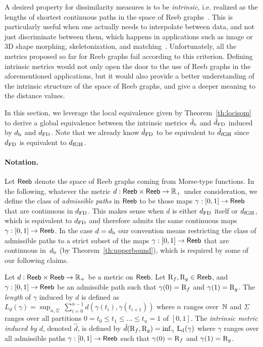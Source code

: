 A desired property for dissimilarity measures is to be {\em intrinsic}, i.e. realized as the lengths of shortest continuous 
paths in the space of Reeb graphs~\cite{Burago01}. This is particularly useful when one actually needs to interpolate between data, 
and not just discriminate between them, which happens in applications such as 
image or 3D shape morphing, skeletonization, and matching~\cite{Ge11, Mohamed12, Mukasa06, Tierny06}. 
Unfortunately, all the  metrics proposed so far for Reeb graphs fail according to this criterion.   
Defining intrinsic metrics would not only open the door to the use of Reeb graphs in the aforementioned applications, 
but it would also provide a better understanding of the intrinsic structure of the space of Reeb graphs, and give a deeper meaning to the distance values.

In this section, we leverage the local equivalence given by
Theorem~\ref{th:locisom} to derive a global equivalence between
the intrinsic metrics $\hat d_{\rm b}$ and $\hat d_{\rm FD}$ induced by $d_{\rm b}$ and
$d_{\rm FD}$.  Note that we already know $\hat d_{\rm FD}$ to be equivalent to
$\hat d_{\rm fGH}$ %
since $d_{\rm FD}$ is equivalent
to $d_{\rm fGH}$. %

\paragraph*{Notation.} 
Let ${\sf Reeb}$ denote the space of Reeb graphs coming from Morse-type functions.
In the following, whatever the metric  
$d:{\sf Reeb}\times{\sf Reeb}\rightarrow\mathbb{R}_+$ under consideration, we define the 
class of {\em admissible paths} in
${\sf Reeb}$ to be those maps $\gamma:[0,1]\rightarrow{\sf Reeb}$ that are
continuous in $d_{\rm FD}$. This makes sense when $d$ is either $d_{\rm FD}$
itself or $d_{\rm fGH}$, %
which is equivalent to $d_{\rm FD}$ and therefore admits the same continuous maps
$\gamma:[0,1]\rightarrow{\sf Reeb}$. In the case $d=d_{\rm b}$ our convention
means restricting the class of admissible paths to a strict subset of
the maps $\gamma:[0,1]\rightarrow{\sf Reeb}$ that are continuous in~$d_{\rm b}$ (by
Theorem~\ref{th:upperbound}), which is required by some of our
following claims.

\begin{defin}
Let $d:{\sf Reeb}\times{\sf Reeb}\rightarrow\mathbb{R}_+$ be a metric on ${\sf Reeb}$. Let $\mathrm{R}_f,\mathrm{R}_g\in{\sf Reeb}$,
and $\gamma:[0,1]\rightarrow{\sf Reeb}$ be an admissible path such that $\gamma(0)=\mathrm{R}_f$ and $\gamma(1)=\mathrm{R}_g$.
The {\em length} of $\gamma$ induced by $d$ is defined as
$L_d(\gamma)= \sup_{n,\Sigma}\ \sum_{i=0}^{n-1} d(\gamma(t_{i}), \gamma(t_{i+1}))$
where $n$ ranges over~$\mathbb{N}$ and $\Sigma$ ranges over all partitions $0=t_0\leq t_1\leq ... \leq t_n=1$ of $[0,1]$.
%
The {\em intrinsic metric induced by $d$}, denoted $\hat d$, is defined by
%
$\hat d(\mathrm{R}_f,\mathrm{R}_g)=\rm{inf}_\gamma\ L_d(\gamma)$
%
where $\gamma$ ranges over all admissible paths $\gamma:[0,1]\rightarrow{\sf Reeb}$ 
such that $\gamma(0)=\mathrm{R}_f$ and $\gamma(1)=\mathrm{R}_g$.
\end{defin}

